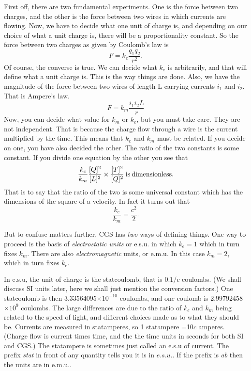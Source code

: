 \documentclass[12pt]{article}
\begin{document}
First off, there are two fundamental experiments. One is the force between two
charges, and the other is the force between two wires in which currents are flowing. Now, we have to decide what one unit of charge is, and depending on our choice of what a unit charge is, there will be a proportionality constant. So
the force between two charges as given by Coulomb's law is
\begin{equation}
F=k_e \frac{q_1 q_2}{r^2}.
\end{equation}
Of course, the converse is true. We can decide what $k_e$ is arbitrarily, and that will define what a unit charge is. This is the way things are done.
Also, we have the magnitude of the  force between two wires of length L carrying currents $i_1$ and $i_2$. That is Ampere's law.
\begin{equation}
F=k_m \frac{ i_1 i_2 L}{r}
\end{equation}
Now, you can decide what value for $k_m$ or $k_e$, but you must take care. They are not independent. That is because the charge flow through a wire is the current multiplied by the time.  This means that $k_e$ and $k_m$ must be related. 
If you decide on one, you have also decided the other. The ratio of the two
constants is some constant.
If you divide one equation by the other you see that
\begin{equation}
  \frac{k_e}{k_m} \frac{ [Q]^2}{[L]^2} \times \frac{[T]^2}{[Q]^2} \> {\rm is \> dimensionless}.
\end{equation}
That is to say that the ratio of the two is some universal constant which has the dimensions of the square of a velocity. In fact it turns out that
\begin{equation}
\frac{k_e}{k_m}=\frac{c^2}{2}.
\end{equation}

But to confuse matters further, CGS has {\it two} ways of defining things.
 One way to proceed  is the basis of {\it electrostatic units} or e.s.u. in which $k_e=1$
 which in turn fixes $k_m$. There are also 
{\it electromagnetic} units, or e.m.u. In this case $k_m=2$, which in turn fixes
$ k_e$.

In e.s.u, the unit of charge is the statcoulomb, that is $0.1/c$ coulombs.
(We shall discuss SI units later, here we shall just mention the conversion factors.) One statcoulomb is then 3.33564095$\times 10^{-10}$  coulombs, and one coulomb is
2.99792458$ \times 10^9$ coulombs. The large differences are due to the ratio 
of $k_e$ and $k_m$ being related to the speed of light, and different choices
made as to what they should be. Currents are measured in statamperes, so
1 statampere =10$c$ amperes. (Charge flow is current times time, and the
the time units in seconds for both SI and CGS.) The statampere is sometimes 
just called an e.s.u of current. The prefix {\it stat} in front of any quantity tells you it is
in $e.s.u.$. If the prefix is {\it ab} then the units are in e.m.u..
\end{document}
